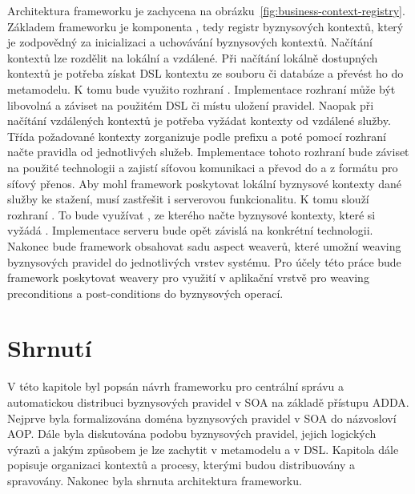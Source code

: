 Architektura frameworku je zachycena na obrázku~\ref{fig:business-context-registry}.
Základem frameworku je komponenta , tedy registr
byznysových kontextů, který je zodpovědný za inicializaci a uchovávání byznysových kontextů.
Načítání kontextů lze rozdělit na lokální a vzdálené. Při načítání lokálně dostupných kontextů
je potřeba získat \gls{DSL} kontextu ze souboru či databáze a převést ho do metamodelu.
K tomu bude využito rozhraní . Implementace rozhraní může být libovolná
a záviset na použitém \gls{DSL} či místu uložení pravidel. Naopak při načítání vzdálených
kontextů je potřeba vyžádat kontexty od vzdálené služby. Třída  požadované
kontexty zorganizuje podle prefixu a poté pomocí rozhraní  načte
pravidla od jednotlivých služeb. Implementace tohoto rozhraní bude záviset na použité
technologii a zajistí síťovou komunikaci a převod do a z formátu pro síťový přenos.
Aby mohl framework poskytovat lokální byznysové kontexty dané služby ke stažení, musí zastřešit
i serverovou funkcionalitu. K tomu slouží rozhraní . To bude využívat
, ze kterého načte byznysové kontexty, které si vyžádá .
Implementace serveru bude opět závislá na konkrétní technologii.
Nakonec bude framework obsahovat sadu aspect weaverů, které umožní weaving byznysových pravidel do
jednotlivých vrstev systému. Pro účely této práce bude framework poskytovat weavery pro využití v
aplikační vrstvě pro weaving preconditions a post-conditions do byznysových operací.

\section{Shrnutí}

V této kapitole byl popsán návrh frameworku pro centrální správu a automatickou distribuci
byznysových pravidel v \gls{SOA} na základě přístupu \gls{ADDA}. Nejprve byla formalizována
doména byznysových pravidel v \gls{SOA} do názvosloví \gls{AOP}. Dále byla diskutována podobu byznysových pravidel,
jejich logických výrazů a jakým způsobem je lze zachytit v metamodelu a v \gls{DSL}.
Kapitola dále popisuje organizaci kontextů a procesy, kterými budou distribuovány a spravovány.
Nakonec byla shrnuta architektura frameworku.
